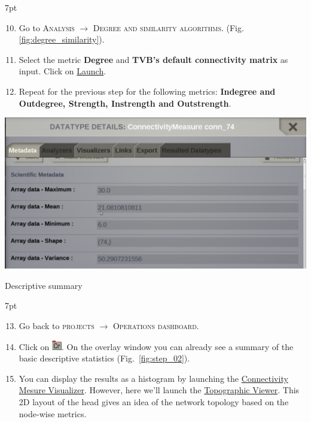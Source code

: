 \documentclass{tufte-handout}
\newenvironment{formal}{%
  \def\FrameCommand{%
    \hspace{1pt}%
    {\color{DarkBlue}\vrule width 2pt}%
    {\color{formalshade}\vrule width 4pt}%
    \colorbox{formalshade}%
  }%
  \MakeFramed{\advance\hsize-\width\FrameRestore}%
  \noindent\hspace{-4.55pt}%
  \begin{adjustwidth}{}{7pt}%
  \vspace{2pt}\vspace{2pt}%
}
{%
  \vspace{2pt}\end{adjustwidth}\endMakeFramed%
}
\begin{document}
\begin{formal}
  \begin{enumerate}[resume]
  \setcounter{enumi}{9}
  \item Go to \textsc{Analysis} $\rightarrow$ \textsc{Degree and similarity algorithms}.  (Fig. \ref{fig:degree_similarity}).
  \item Select the metric \textbf{Degree} and \textbf{TVB's default connectivity matrix} as input. Click on \underline{Launch}.
  \item Repeat for the previous step for the following metrics: \textbf{Indegree and Outdegree, Strength, Instrength and Outstrength}.
  \end{enumerate}
\end{formal}

\begin{marginfigure}
  \includegraphics[width=\linewidth]{Handout_UI_ModellingStructuralLesions_AnalysisResult}%
  \caption{Descriptive summary}%
  \label{fig:step_02}%
\end{marginfigure}

\begin{formal}
  \begin{enumerate}[resume]
  \setcounter{enumi}{12}
  \item Go back to \textsc{projects} $\rightarrow$ \textsc{Operations dashboard}.
  \item Click on \includegraphics[width=0.042\linewidth]{nodeConnectivityMeasure}. On
  the overlay window you can already see a summary of the basic descriptive
  statistics (Fig.~\ref{fig:step_02}).
  \item You can display the results as a histogram by launching the \underline{Connectivity Mesure Visualizer}. However, here we'll launch the \underline{Topographic Viewer}. This 2D layout of the
head gives an idea of the network topology based on the node-wise
metrics. 
  \end{enumerate}
\end{formal}
\end{document}
